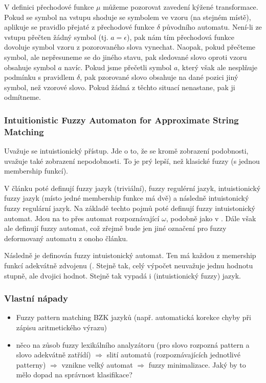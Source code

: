 \documentclass[a4paper,10pt]{article}
\begin{document}
V definici přechodové funkce $\mu$ můžeme pozorovat zavedení kýžené transformace. Pokud se symbol na vstupu shoduje se symbolem ve vzoru (na stejném místě), aplikuje se pravidlo přejaté z přechodové funkce $\delta$ původního automatu. Není-li ze vstupu přečten žádný symbol (tj. $a = \epsilon$), pak nám tím přechodová funkce dovoluje symbol vzoru z pozorovaného slova vynechat. Naopak, pokud přečteme symbol, ale nepřesuneme se do jiného stavu, pak sledované slovo oproti vzoru obsahuje symbol $a$ navíc. Pokud jsme přečetli symbol $a$, který však ale nesplňuje podmínku s pravidlem $\delta$, pak pzorované slovo obsahuje na dané pozici jiný symbol, než vzorové slovo. Pokud žádná z těchto situací nenastane, pak ji odmítneme. 


\subsubsection*{Intuitionistic Fuzzy Automaton for Approximate String Matching \cite{RavChoTri-IntFuzzAutApprStrMatch}}

Uvažuje se intuistionický přístup.  Jde o to, že se kromě zobrazení podobnosti, uvažuje také zobrazení nepodobnosti. To je prý lepší, než klasické fuzzy (s jednou membership funkcí).

V článku poté definují fuzzy jazyk (triviální), fuzzy regulérní jazyk, intuistionický fuzzy jazyk (místo jedné membership funkce má dvě) a následně intuistonický fuzzy regulární jazyk. Na základě techto pojmů poté definují fuzzy intuistonický automat. Jdou na to přes automat rozpoznávající $\omega$, podobně jako v \cite{AstGariGonVillFar-ApprStrMatUsiDefFuzzAutLearExpr}. Dále však ale definují fuzzy automat, což zřejmě bude jen jiné označení pro fuzzy deformovaný automatu z onoho článku.

Následně je definován fuzzy intuistonický automat. Ten má každou z memership funkcí adekvátně zdvojenu (. Stejně tak, celý výpočet neuvažuje jednu hodnotu stupně, ale dvojici hodnot. Stejně tak vypadá i (intuistionický fuzzy) jazyk.

\subsubsection*{Vlastní nápady}
\begin{itemize}
 \item Fuzzy pattern matching BZK jazyků (např. automatická korekce chyby při zápisu aritmetického výrazu)
 \item něco na zůsob fuzzy lexikálního analyzátoru (pro slovo rozpozná pattern a slovo adekvátně zatřídí) $\Rightarrow$ slití automatů (rozpoznávajících jednotlivé patterny) $\Rightarrow$ vznikne velký automat $\Rightarrow$ fuzzy minimalizace. Jaký by to mělo dopad na správnost klasifikace?
\end{itemize}
\end{document}
